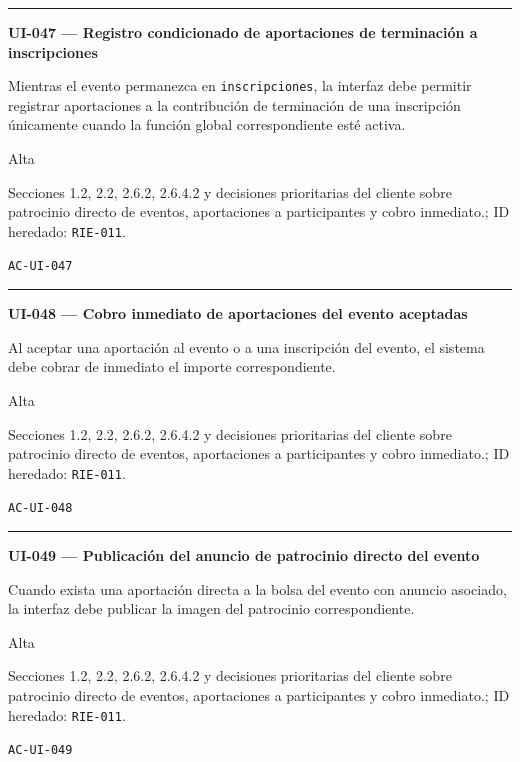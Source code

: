 \documentclass[10pt,letterpaper]{article}
\begin{document}
\vspace{0.25em}\hrule\vspace{0.65em}
\noindent\textbf{UI-047 --- Registro condicionado de aportaciones de terminación a inscripciones}\par
\begin{description}[style=nextline,leftmargin=3.15cm,labelwidth=2.8cm,font=\normalfont\bfseries]
\item[Obligación] Mientras el evento permanezca en \texttt{inscripciones}, la interfaz debe permitir registrar aportaciones a la contribución de terminación de una inscripción únicamente cuando la función global correspondiente esté activa.
\item[Prioridad] Alta
\item[Procedencia] Secciones 1.2, 2.2, 2.6.2, 2.6.4.2 y decisiones prioritarias del cliente sobre patrocinio directo de eventos, aportaciones a participantes y cobro inmediato.; ID heredado: \texttt{RIE-011}.
\item[Verificación] \texttt{AC-UI-047}
\end{description}
\vspace{0.25em}\hrule\vspace{0.65em}
\noindent\textbf{UI-048 --- Cobro inmediato de aportaciones del evento aceptadas}\par
\begin{description}[style=nextline,leftmargin=3.15cm,labelwidth=2.8cm,font=\normalfont\bfseries]
\item[Obligación] Al aceptar una aportación al evento o a una inscripción del evento, el sistema debe cobrar de inmediato el importe correspondiente.
\item[Prioridad] Alta
\item[Procedencia] Secciones 1.2, 2.2, 2.6.2, 2.6.4.2 y decisiones prioritarias del cliente sobre patrocinio directo de eventos, aportaciones a participantes y cobro inmediato.; ID heredado: \texttt{RIE-011}.
\item[Verificación] \texttt{AC-UI-048}
\end{description}
\vspace{0.25em}\hrule\vspace{0.65em}
\noindent\textbf{UI-049 --- Publicación del anuncio de patrocinio directo del evento}\par
\begin{description}[style=nextline,leftmargin=3.15cm,labelwidth=2.8cm,font=\normalfont\bfseries]
\item[Obligación] Cuando exista una aportación directa a la bolsa del evento con anuncio asociado, la interfaz debe publicar la imagen del patrocinio correspondiente.
\item[Prioridad] Alta
\item[Procedencia] Secciones 1.2, 2.2, 2.6.2, 2.6.4.2 y decisiones prioritarias del cliente sobre patrocinio directo de eventos, aportaciones a participantes y cobro inmediato.; ID heredado: \texttt{RIE-011}.
\item[Verificación] \texttt{AC-UI-049}
\end{description}
\end{document}
